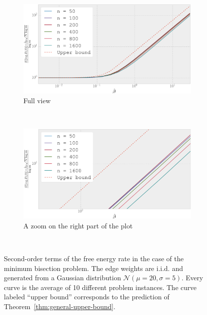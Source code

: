 \begin{figure}[ht!]
      \centering
      \begin{subfigure}[b]{.7\textwidth}
          \label{fig:mbp_fe_all}
          \includegraphics[width=\textwidth]{figures/ch_free_energy/m20_std5_iter10_big}
          \caption{Full view}
      \end{subfigure}
      \\[.5cm]
     \begin{subfigure}[b]{.7\textwidth}
          \label{fig:mbp_fe_zoom}
          \includegraphics[width=\textwidth]{figures/ch_free_energy/m20_std5_iter10_big_zoomed}
          \caption{A zoom on the right part of the plot}
      \end{subfigure}
      \\[.5cm]
      \caption{Second-order terms of the free energy rate in the case of the
      minimum bisection problem. The edge weights are i.i.d. and generated
      from a Gaussian distribution $\mathcal{N}(\mu=20,\sigma=5)$. Every curve
      is the average of 10 different problem instances. The curve labeled
      ``upper bound'' corresponds to the prediction of Theorem~\ref{thm:general-upper-bound}.}
      \label{fig:mbp_fe}
\end{figure}

